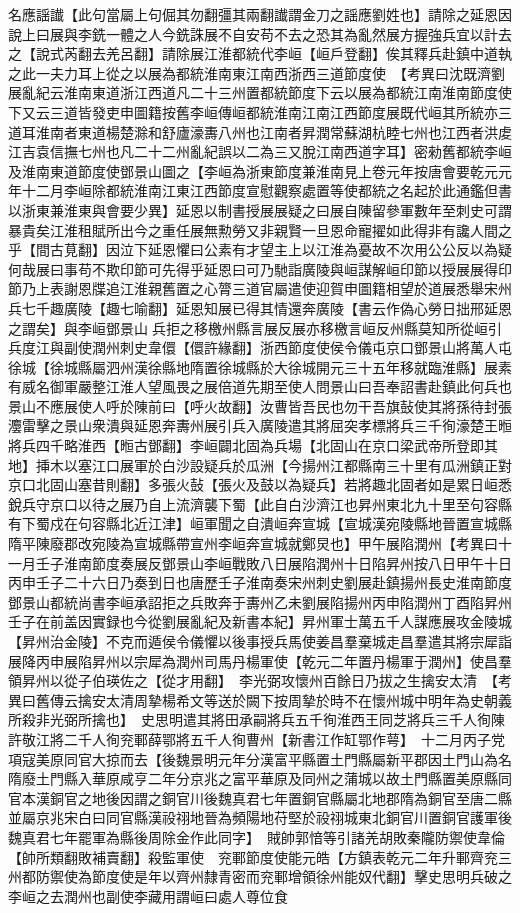 名應謡䜟【此句當屬上句倔其勿翻彊其兩翻䜟謂金刀之謡應劉姓也】請除之延恩因說上曰展與李銑一體之人今銑誅展不自安苟不去之恐其為亂然展方握強兵宜以計去之【說式芮翻去羌呂翻】請除展江淮都統代李峘【峘戶登翻】俟其釋兵赴鎮中道執之此一夫力耳上從之以展為都統淮南東江南西浙西三道節度使　【考異曰沈既濟劉展亂紀云淮南東道浙江西道凡二十三州置都統節度下云以展為都統江南淮南節度使下又云三道皆發吏申圖籍按舊李峘傳峘都統淮南江南江西節度展既代峘其所統亦三道耳淮南者東道楊楚滁和舒廬濠夀八州也江南者昇潤常蘇湖杭睦七州也江西者洪䖍江吉袁信撫七州也凡二十二州亂紀誤以二為三又脫江南西道字耳】密勑舊都統李峘及淮南東道節度使鄧景山圖之【李峘為浙東節度兼淮南見上卷元年按唐會要乾元元年十二月李峘除都統淮南江東江西節度宣慰觀察處置等使都統之名起於此通鑑但書以浙東兼淮東與會要少異】延恩以制書授展展疑之曰展自陳留參軍數年至刺史可謂暴貴矣江淮租賦所出今之重任展無勲勞又非親賢一旦恩命寵擢如此得非有讒人間之乎【間古莧翻】因泣下延恩懼曰公素有才望主上以江淮為憂故不次用公公反以為疑何哉展曰事苟不欺印節可先得乎延恩曰可乃馳詣廣陵與峘謀解峘印節以授展展得印節乃上表謝恩牒追江淮親舊置之心膂三道官屬遣使迎賀申圖籍相望於道展悉舉宋州兵七千趣廣陵【趣七喻翻】延恩知展已得其情還奔廣陵【書云作偽心勞日拙邢延恩之謂矣】與李峘鄧景山兵拒之移檄州縣言展反展亦移檄言峘反州縣莫知所從峘引兵度江與副使潤州刺史韋儇【儇許緣翻】浙西節度使侯令儀屯京口鄧景山將萬人屯徐城【徐城縣屬泗州漢徐縣地隋置徐城縣於大徐城開元三十五年移就臨淮縣】展素有威名御軍嚴整江淮人望風畏之展倍道先期至使人問景山曰吾奉詔書赴鎮此何兵也景山不應展使人呼於陳前曰【呼火故翻】汝曹皆吾民也勿干吾旗鼔使其將孫待封張灋雷擊之景山衆潰與延恩奔夀州展引兵入廣陵遣其將屈突孝標將兵三千徇濠楚王暅將兵四千略淮西【暅古鄧翻】李峘闢北固為兵場【北固山在京口梁武帝所登即其地】挿木以塞江口展軍於白沙設疑兵於瓜洲【今揚州江都縣南三十里有瓜洲鎮正對京口北固山塞昔則翻】多張火鼔【張火及鼓以為疑兵】若將趣北固者如是累日峘悉銳兵守京口以待之展乃自上流濟襲下蜀【此自白沙濟江也昇州東北九十里至句容縣有下蜀戍在句容縣北近江津】峘軍聞之自潰峘奔宣城【宣城漢宛陵縣地晉置宣城縣隋平陳廢郡改宛陵為宣城縣帶宣州李峘奔宣城就鄭炅也】甲午展陷潤州【考異曰十一月壬子淮南節度奏展反鄧景山李峘戰敗八日展陷潤州十日陷昇州按八日甲午十日丙申壬子二十六日乃奏到日也唐歷壬子淮南奏宋州刺史劉展赴鎮揚州長史淮南節度鄧景山都統尚書李峘承詔拒之兵敗奔于夀州乙未劉展陷揚州丙申陷潤州丁酉陷昇州壬子在前盖因實録也今從劉展亂紀及新書本紀】昇州軍士萬五千人謀應展攻金陵城【昇州治金陵】不克而遁侯令儀懼以後事授兵馬使姜昌羣棄城走昌羣遣其將宗犀詣展降丙申展陷昇州以宗犀為潤州司馬丹楊軍使【乾元二年置丹楊軍于潤州】使昌羣領昇州以從子伯瑛佐之【從才用翻】　李光弼攻懷州百餘日乃拔之生擒安太清　【考異曰舊傳云擒安太清周摯楊希文等送於闕下按周摯於時不在懷州城中明年為史朝義所殺非光弼所擒也】　史思明遣其將田承嗣將兵五千徇淮西王同芝將兵三千人徇陳許敬江將二千人徇兖鄆薛鄂將五千人徇曹州【新書江作缸鄂作萼】　十二月丙子党項寇美原同官大掠而去【後魏景明元年分漢富平縣置土門縣屬新平郡因土門山為名隋廢土門縣入華原咸亨二年分京兆之富平華原及同州之蒲城以故土門縣置美原縣同官本漢銅官之地後因謂之銅官川後魏真君七年置銅官縣屬北地郡隋為銅官至唐二縣並屬京兆宋白曰同官縣漢祋祤地晉為頻陽地苻堅於祋祤城東北銅官川置銅官護軍後魏真君七年罷軍為縣後周除金作此同字】　賊帥郭愔等引諸羌胡敗秦隴防禦使韋倫【帥所類翻敗補賣翻】殺監軍使　兖鄆節度使能元皓【方鎮表乾元二年升鄆齊兖三州都防禦使為節度使是年以齊州隸青密而兖鄆增領徐州能奴代翻】擊史思明兵破之李峘之去潤州也副使李藏用謂峘曰處人尊位食

